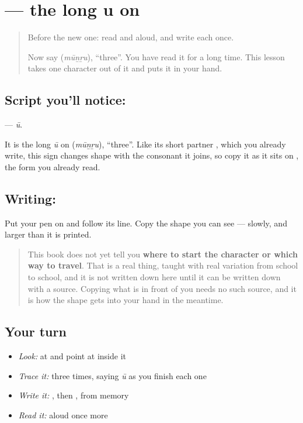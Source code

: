 \section[\texorpdfstring{\ta{ூ} (ū)}{ூ (ū)}]{ — the long u on }

\label{lesson:TA-S135-vowel-sign-uu}



\begin{quote}
Before the new one: read  and  aloud, and write each once.

Now say \textbf{} (\emph{mūṉṟu}), \textquotedblleft{}three\textquotedblright{}. You have read it for a long time. This lesson takes one character out of it and puts it in your hand.
\end{quote}

\subsection*{Script you'll notice: }
\textbf{} — \emph{ū}.

It is the long \emph{ū} on \textbf{} (\emph{mūṉṟu}), \textquotedblleft{}three\textquotedblright{}. Like its short partner , which you already write, this sign changes shape with the consonant it joins, so copy it as it sits on \textbf{}, the form you already read.

\subsection*{Writing: }
Put your pen on  and follow its line. Copy the shape you can see — slowly, and larger than it is printed.

\begin{quote}
This book does not yet tell you \textbf{where to start the character or which way to travel}. That is a real thing, taught with real variation from school to school, and it is not written down here until it can be written down with a source. Copying what is in front of you needs no such source, and it is how the shape gets into your hand in the meantime.
\end{quote}

\subsection*{Your turn}
\begin{itemize}
\raggedright
  \item \emph{Look:} at \textbf{} and point at  inside it
  \item \emph{Trace it:}  three times, saying \emph{ū} as you finish each one
  \item \emph{Write it:} , then , from memory
  \item \emph{Read it:} \textbf{} aloud once more
\end{itemize}

